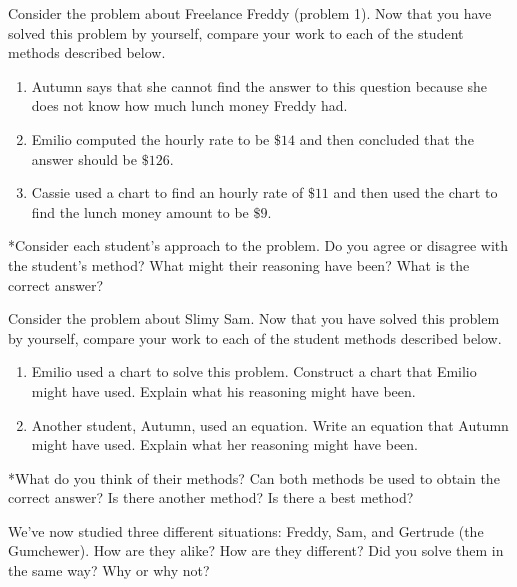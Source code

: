 \documentclass[nooutcomes, noauthor, handout]{ximera}
\begin{document}
\pagebreak

\begin{problem} Consider the problem about Freelance Freddy (problem 1).  Now that you have solved this problem by yourself, compare your work to each of the student methods described below.  

\begin{enumerate}
\item Autumn says that she cannot find the answer to this question because she does not know how much lunch money Freddy had.
\item Emilio computed the hourly rate to be $\$14$ and then concluded that the answer should be $\$126$.
\item Cassie used a chart to find an hourly rate of $\$11$ and then used the chart to find the lunch money amount to be $\$9$.

\end{enumerate}

*Consider each student's approach to the problem.  Do you agree or disagree with the student's method? What might their reasoning have been?  What is the correct answer?
\end{problem}

\pagebreak
\begin{problem}
Consider the problem about Slimy Sam.  Now that you have solved this problem by yourself, compare your work to each of the student methods described below.  

\begin{enumerate}

\item Emilio used a chart to solve this problem.  Construct a chart that Emilio might have used.  Explain what his reasoning might have been.

\item Another student, Autumn, used an equation. Write an equation that Autumn might have used.   Explain what her reasoning might have been.

\end{enumerate}

*What do you think of their methods?  Can both methods be used to obtain the correct answer?  Is there another method? Is there a best method? 
\end{problem}



\pagebreak

\begin{problem}
We've now studied three different situations: Freddy, Sam, and Gertrude (the Gumchewer). How are they alike?  How are they different?  Did you solve them in the same way?  Why or why not?
\end{problem}
\end{document}

